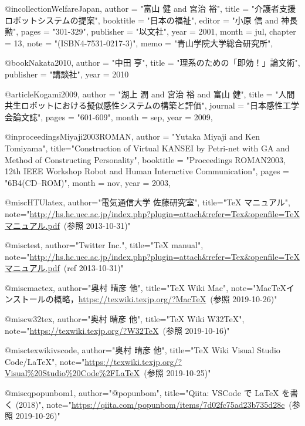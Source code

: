 @incollection{WelfareJapan,
 author = "富山 健 and 宮治 裕",
 title = "介護者支援ロボットシステムの提案",
 booktitle = "日本の福祉",
 editor = "小原 信 and 神長 勲",
 pages = "301-329",
 publisher = "以文社",
 year = 2001,
 month = jul,
 chapter = 13,
 note = "(ISBN4-7531-0217-3)",
 memo = "青山学院大学総合研究所",
}

@book{Nakata2010,
author = "中田 亨",
title = "理系のための「即効！」論文術",
publisher = "講談社",
year = 2010
}

@article{Kogami2009,
 author = "湖上 潤 and 宮治 裕 and 富山 健",
 title = "人間共生ロボットにおける擬似感性システムの構築と評価",
 journal = "日本感性工学会論文誌",
 pages = "601-609",
 month = sep,
 year = 2009,
}

@inproceedings{Miyaji2003ROMAN,
author = "Yutaka Miyaji and Ken Tomiyama",
title="Construction of Virtual KANSEI by Petri-net with GA and Method of Constructing Personality",
booktitle = "Proceedings ROMAN2003, 12th IEEE Workshop Robot and Human Interactive Communication",
pages = "6B4(CD--ROM)",
month = nov,
year = 2003,
}

@misc{HTUlatex,
author="電気通信大学 佐藤研究室",
title="TeX マニュアル",
note="\url{http://hs.hc.uec.ac.jp/index.php?plugin=attach&refer=Tex&openfile=TeXマニュアル.pdf}~(参照 2013-10-31)"
}

@misc{test,
author="Twitter Inc.",
title="TeX manual",
note="\url{http://hs.hc.uec.ac.jp/index.php?plugin=attach&refer=Tex&openfile=TeXマニュアル.pdf}~(ref 2013-10-31)"
}

@misc{mactex,
author="奥村 晴彦 他",
title="TeX Wiki Mac",
note="MacTeXインストールの概略，\url{https://texwiki.texjp.org/?MacTeX}~(参照 2019-10-26)"
}

@misc{w32tex,
author="奥村 晴彦 他",
title="TeX Wiki W32TeX",
note="\url{https://texwiki.texjp.org/?W32TeX}~(参照 2019-10-16)"
}

@misc{texwikivscode,
author="奥村 晴彦 他",
title="TeX Wiki Visual Studio Code/LaTeX",
note="\url{https://texwiki.texjp.org/?Visual%20Studio%20Code%2FLaTeX}~(参照 2019-10-25)"
}

@misc{qpopunbom1,
author="@popunbom",
title="Qiita: VSCode で LaTeX を書く (2018)",
note="\url{https://qiita.com/popunbom/items/7d02fc75ad23b735d28c}~(参照 2019-10-26)"
}
